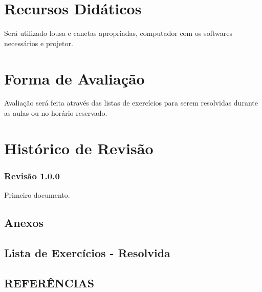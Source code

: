 \documentclass[12pt,a4paper]{report}
\begin{document}
\chapter{Recursos Didáticos}

Será utilizado lousa e canetas apropriadas, computador com os softwares necessários e projetor.

\chapter{Forma de Avaliação}

Avaliação será feita através das listas de exercícios para serem resolvidas durante as aulas ou no horário reservado.

\newpage

\chapter{Histórico de Revisão}

\subsection*{Revisão 1.0.0}

Primeiro documento.

\newpage

\begin{appendices}

    \chapter{Anexos}

    \section{Lista de Exercícios - Resolvida}
    

\end{appendices}

\newpage

\begin{center}
    \chapter*{REFERÊNCIAS}
\end{center}




\endgroup
\end{document}
